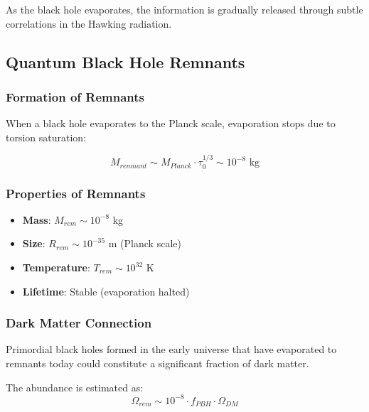 As the black hole evaporates, the information is gradually released through subtle correlations in the Hawking radiation.

\subsection{Quantum Black Hole Remnants}

\subsubsection{Formation of Remnants}

When a black hole evaporates to the Planck scale, evaporation stops due to torsion saturation:

\begin{equation}
    M_{remnant} \sim M_{Planck} \cdot \tau_0^{1/3} \sim 10^{-8} \text{ kg}
\end{equation}

\subsubsection{Properties of Remnants}

\begin{itemize}
    \item \textbf{Mass}: $M_{rem} \sim 10^{-8}$ kg
    \item \textbf{Size}: $R_{rem} \sim 10^{-35}$ m (Planck scale)
    \item \textbf{Temperature}: $T_{rem} \sim 10^{32}$ K
    \item \textbf{Lifetime}: Stable (evaporation halted)
\end{itemize}

\subsubsection{Dark Matter Connection}

\begin{proposition}
Primordial black holes formed in the early universe that have evaporated to remnants today could constitute a significant fraction of dark matter.
\end{proposition}

The abundance is estimated as:
\begin{equation}
    \Omega_{rem} \sim 10^{-8} \cdot f_{PBH} \cdot \Omega_{DM}
\end{equation}

